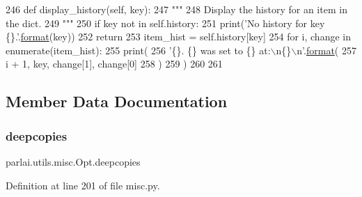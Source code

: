 \begin{DoxyCode}
246     \textcolor{keyword}{def }display\_history(self, key):
247         \textcolor{stringliteral}{"""}
248 \textcolor{stringliteral}{        Display the history for an item in the dict.}
249 \textcolor{stringliteral}{        """}
250         \textcolor{keywordflow}{if} key \textcolor{keywordflow}{not} \textcolor{keywordflow}{in} self.history:
251             print(\textcolor{stringliteral}{'No history for key \{\}.'}.\hyperlink{namespaceparlai_1_1chat__service_1_1services_1_1messenger_1_1shared__utils_a32e2e2022b824fbaf80c747160b52a76}{format}(key))
252             \textcolor{keywordflow}{return}
253         item\_hist = self.history[key]
254         \textcolor{keywordflow}{for} i, change \textcolor{keywordflow}{in} enumerate(item\_hist):
255             print(
256                 \textcolor{stringliteral}{'\{\}. \{\} was set to \{\} at:\(\backslash\)n\{\}\(\backslash\)n'}.\hyperlink{namespaceparlai_1_1chat__service_1_1services_1_1messenger_1_1shared__utils_a32e2e2022b824fbaf80c747160b52a76}{format}(
257                     i + 1, key, change[1], change[0]
258                 )
259             )
260 
261 
\end{DoxyCode}


\subsection{Member Data Documentation}
\mbox{\label{classparlai_1_1utils_1_1misc_1_1Opt_a2bf9d8a08183cd0f988b7a116ae9b396}} 
\subsubsection{\texorpdfstring{deepcopies}{deepcopies}}
{\footnotesize\ttfamily parlai.\+utils.\+misc.\+Opt.\+deepcopies}



Definition at line 201 of file misc.\+py.

\mbox{\label{classparlai_1_1utils_1_1misc_1_1Opt_a24659f7fa7a137ccd60a139a60d64da2}} 
